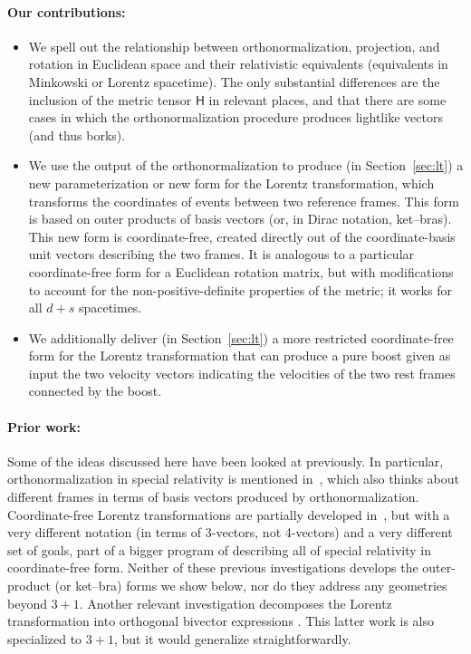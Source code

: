 \documentclass{article}
\newcommand{\metric}{\mathsf{H}}
\newcommand{\plus}{\!+\!} %
\newcommand{\secref}[1]{Section~\ref{#1}}
\begin{document}
\paragraph{Our contributions:}
\begin{itemize}
\item
We spell out the relationship between orthonormalization, projection, and rotation in Euclidean space and their relativistic equivalents (equivalents in Minkowski or Lorentz spacetime).
The only substantial differences are the inclusion of the metric tensor $\metric$ in relevant places, and that there are some cases in which the orthonormalization procedure produces lightlike vectors (and thus borks).
\item
We use the output of the orthonormalization to produce (in \secref{sec:lt}) a new parameterization or new form for the Lorentz transformation, which transforms the coordinates of events between two reference frames.
This form is based on outer products of basis vectors (or, in Dirac notation, ket--bras).
This new form is coordinate-free, created directly out of the coordinate-basis unit vectors describing the two frames.
It is analogous to a particular coordinate-free form for a Euclidean rotation matrix, but with modifications to account for the non-positive-definite properties of the metric; it works for all $d\plus s$ spacetimes.
\item
We additionally deliver (in \secref{sec:lt}) a more restricted coordinate-free form for the Lorentz transformation that can produce a pure boost given as input the two velocity vectors indicating the velocities of the two rest frames connected by the boost.
\end{itemize}

\paragraph{Prior work:}
Some of the ideas discussed here have been looked at previously.
In particular, orthonormalization in special relativity is mentioned in~\cite{joot}, which also thinks about different frames in terms of basis vectors produced by orthonormalization.
Coordinate-free Lorentz transformations are partially developed in~\cite{wagner}, but with a very different notation (in terms of 3-vectors, not 4-vectors) and a very different set of goals, part of a bigger program of describing all of special relativity in coordinate-free form.
Neither of these previous investigations develops the outer-product (or ket--bra) forms we show below, nor do they address any geometries beyond $3\plus 1$.
Another relevant investigation decomposes the Lorentz transformation into orthogonal bivector expressions \cite{hanson}.
This latter work is also specialized to $3+1$, but it would generalize straightforwardly.
\end{document}
